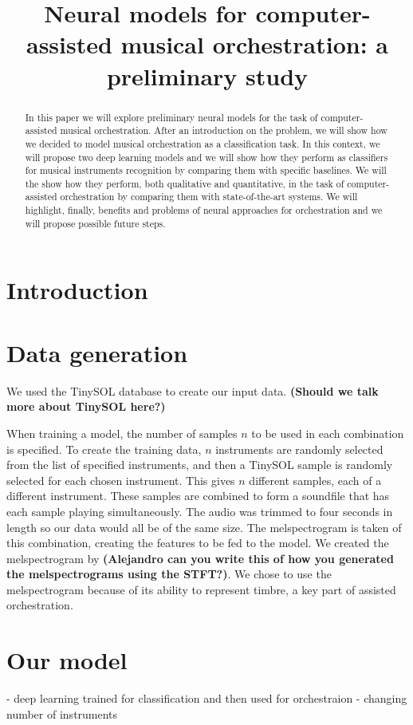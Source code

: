 \documentclass{article}
\title{Neural models for computer-assisted musical orchestration: a preliminary study}
\begin{document}
%
\maketitle
%
\begin{abstract}
In this paper we will explore preliminary neural models for the task of computer-assisted musical orchestration. After an introduction on the problem, we will show how we decided to model musical orchestration as a classification task. In this context, we will propose two deep learning models and we will show how they perform as classifiers for musical instruments recognition by comparing them with specific baselines. We will the show how they perform, both qualitative and quantitative, in the task of computer-assisted orchestration by comparing them with state-of-the-art systems. We will highlight, finally, benefits and problems of neural approaches for orchestration and we will propose possible future steps.

\end{abstract}
%
\section{Introduction}\label{sec:introduction}

\section{Data generation}
We used the TinySOL database to create our input data. \textbf{(Should we talk more about TinySOL here?)}

When training a model, the number of samples $n$ to be used in each combination is specified. To create the training data, $n$ instruments are randomly selected from the list of specified instruments, and then a TinySOL sample is randomly selected for each chosen instrument. This gives $n$ different samples, each of a different instrument. These samples are combined to form a soundfile that has each sample playing simultaneously. The audio was trimmed to four seconds in length so our data would all be of the same size. The melspectrogram is taken of this combination, creating the features to be fed to the model. We created the melspectrogram by \textbf{(Alejandro can you write this of how you generated the melspectrograms using the STFT?)}. We chose to use the melspectrogram because of its ability to represent timbre, a key part of assisted orchestration.

\section{Our model}
- deep learning trained for classification and then used for orchestraion
- changing number of instruments
\end{document}
